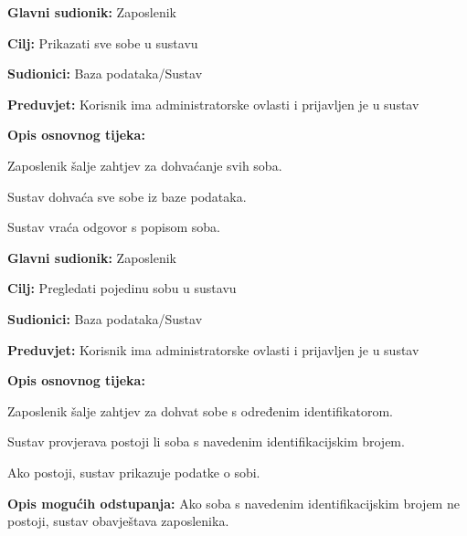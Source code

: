                 \noindent {}
					\begin{packed_item}
	
						\item \textbf{Glavni sudionik: }Zaposlenik
						\item  \textbf{Cilj:} Prikazati sve sobe u sustavu
						\item  \textbf{Sudionici:} Baza podataka/Sustav
						\item  \textbf{Preduvjet:} Korisnik ima administratorske ovlasti i prijavljen je u sustav
						\item  \textbf{Opis osnovnog tijeka:}
						
						\item[] \begin{packed_enum}
	
							\item Zaposlenik šalje zahtjev za dohvaćanje svih soba.
							\item Sustav dohvaća sve sobe iz baze podataka.
                            \item Sustav vraća odgovor s popisom soba.
	
						\end{packed_enum}
						
						
					\end{packed_item}

                \noindent {}
					\begin{packed_item}
	
						\item \textbf{Glavni sudionik: }Zaposlenik
						\item  \textbf{Cilj:} Pregledati pojedinu sobu u sustavu
						\item  \textbf{Sudionici:} Baza podataka/Sustav
						\item  \textbf{Preduvjet:} Korisnik ima administratorske ovlasti i prijavljen je u sustav
						\item  \textbf{Opis osnovnog tijeka:}
						
						\item[] \begin{packed_enum}
	
							\item Zaposlenik šalje zahtjev za dohvat sobe  s određenim identifikatorom.
							\item Sustav provjerava postoji li soba s navedenim identifikacijskim brojem.
                            \item Ako postoji, sustav prikazuje podatke o sobi.
	
						\end{packed_enum}
						
						\item  \textbf{Opis mogućih odstupanja:} Ako soba s navedenim identifikacijskim brojem ne postoji, sustav obavještava zaposlenika.
						
						
					\end{packed_item}

